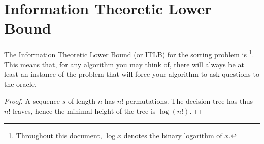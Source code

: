 \section{Information Theoretic Lower Bound}
\label{tree:sorting:ITLB}

\begin{theorem}
The Information Theoretic Lower Bound (or ITLB) for the sorting problem is
\footnote{Throughout this document, $\log x$ denotes the
binary logarithm of $x$.}. This means that, for any algorithm you may think of,
there will always be at least an instance of the problem that will force your
algorithm to ask  questions to the oracle.
\end{theorem}

\begin{proof}
A sequence $s$ of length $n$ has $n!$ permutations. The decision tree has thus
$n!$ leaves, hence the minimal height of the tree is $\log(n!)$.
\end{proof}

